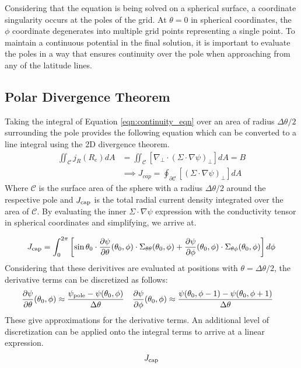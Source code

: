 \documentclass[11pt]{article}
\begin{document}
Considering that the equation is being solved on a spherical surface, a coordinate singularity occurs at the poles of the grid. At $\theta =0$ in spherical coordinates, the $\phi$ coordinate degenerates into multiple grid points representing a single point. To maintain a continuous potential in the final solution, it is important to evaluate the poles in a way that ensures continuity over the pole when approaching from any of the latitude lines.\\



\subsection{Polar Divergence Theorem}
Taking the integral of Equation \ref{eqn:continuity_eqn} over an area of radius $\Delta \theta/2$ surrounding the pole provides the following equation which can be converted to a line integral using the 2D divergence theorem.
\begin{align}
	\iint _{\mathcal{C}} j_R(R_e) dA & =\iint_{\mathcal{C}}  \left[\nabla_\perp\cdot (\Sigma\cdot \nabla \psi)_\perp\right]dA  = B \\
	                                 & \implies	 J_{cap}=
	\oint_{\partial\mathcal{C}}\left[(\Sigma\cdot \nabla \psi)_\perp\right]dA
\end{align}
Where $\mathcal{C}$ is the surface area of the sphere with a radius $\Delta \theta /2$ around the respective pole and $J_{\rm cap}$ is the total radial current density integrated over the area of $\mathcal C$. By evaluating the inner $\Sigma \cdot \nabla \psi$ expression with the conductivity tensor in spherical coordinates and simplifying, we arrive at.

\begin{equation}
	J_{\rm cap} = \int_{0}^{2\pi}\left[\sin\theta_0\cdot
		\frac{\partial \psi}{\partial \theta}(\theta_0, \phi)\cdot
		\Sigma_{\theta\theta} (\theta_0,\phi)+
		\frac{\partial\psi}{\partial\phi}(\theta_0,\phi)\cdot
		\Sigma_{\theta\phi}(\theta_0,\phi)
		\right] d\phi
\end{equation}
Considering that these derivitives are evaluated at positions with $\theta=\Delta\theta/2$, the derivative terms can be discretized as follows:
\begin{align*}
	\frac{\partial \psi}{\partial \theta}(\theta_0, \phi)                &
	\approx \frac{\psi_{\rm pole} - \psi(\theta_0, \phi)}{\Delta \theta} &
	\frac{\partial \psi}{\partial \phi}(\theta_0, \phi)                  &
	\approx \frac{\psi(\theta_0, \phi-1) - \psi(\theta_0, \phi+1)}{\Delta \theta}
\end{align*}
These give approximations for the derivative terms. An additional level of discretization can be applied onto the integral terms to arrive at a linear expression.
\begin{align*}
	J_{\rm cap}
\end{align*}
\end{document}
